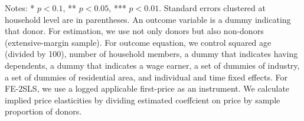 \begin{table}
\begin{threeparttable}
\begin{tablenotes}
\item Notes: * $p < 0.1$, ** $p < 0.05$, *** $p < 0.01$. Standard errors clustered at household level are in parentheses. An outcome variable is a dummy indicating that donor. For estimation, we use not only donors but also non-donors (extensive-margin sample). For outcome equation, we control squared age (divided by 100), number of household members, a dummy that indicates having dependents, a dummy that indicates a wage earner, a set of dummies of industry, a set of dummies of residential area, and individual and time fixed effects. For FE-2SLS, we use a logged applicable first-price as an instrument. We calculate implied price elasticities by dividing estimated coeffcient on price by sample proportion of donors.
\end{tablenotes}
\end{threeparttable}
\end{table}
